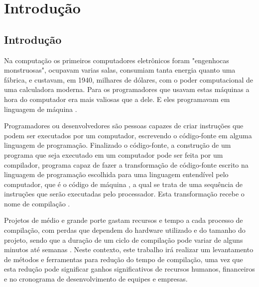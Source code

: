 \part{Introdução}

\chapter*[Introdução]{Introdução}

Na computação os primeiros computadores eletrônicos foram "engenhocas
 monstruosas", ocupavam varias salas, consumiam tanta energia quanto
 uma fábrica, e custavam, em 1940, milhares de dólares, com o poder
 computacional de uma calculadora moderna. Para os
 programadores que usavam estas máquinas a hora do computador era
 mais valiosas que a dele. E eles programavam em linguagem de
 máquina \cite[pág.5]{ref6}.

Programadores ou desenvolvedores são pessoas capazes de criar instruções
 que podem ser executados por um computador, escrevendo o código-fonte em
 alguma linguagem de programação. Finalizado o código-fonte, a construção
 de um programa que seja executado em um computador pode ser feita por um
 compilador, programa capaz de fazer a transformação de
 código-fonte escrito na linguagem de programação escolhida para uma linguagem
 entendível pelo computador, que é o código de máquina \cite[pág.5]{ref6}, a qual
 se trata de uma sequência de instruções que serão executadas  pelo
 processador. Esta transformação recebe o nome de compilação \cite[pág.1]{ref5}.

Projetos de médio e grande porte gastam recursos e tempo a cada processo
 de compilação, com perdas que dependem do hardware utilizado e do tamanho
 do projeto, sendo que a duração de um ciclo de compilação pode variar de
 alguns minutos até semanas \cite[pág.5]{ref6}. Neste contexto, este trabalho
 irá realizar um levantamento de métodos e ferramentas para redução do
 tempo de compilação, uma vez que esta redução pode significar ganhos
 significativos de recursos humanos, financeiros e no cronograma de
 desenvolvimento de equipes e empresas. 



